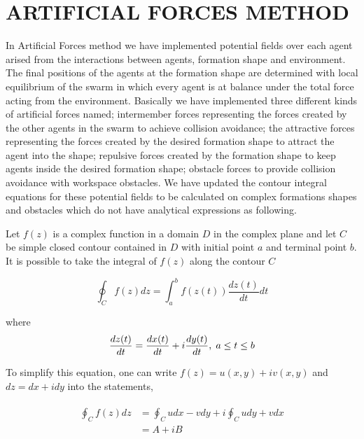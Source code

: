\documentclass[letterpaper, 10 pt, conference]{ieeeconf}  %
\begin{document}
\section{ARTIFICIAL FORCES METHOD}
In Artificial Forces method we have implemented potential fields over each agent arised from the interactions between agents, formation shape and environment. The final positions of the agents at the formation shape  are determined with local equilibrium of the swarm in which every agent is at balance under the total force acting from the environment. Basically we have implemented three different kinds of artificial forces named; intermember forces representing the forces created by the other agents in the swarm to achieve collision avoidance; the attractive forces representing the forces created by the desired formation shape to attract the agent into the shape; repulsive forces created by the formation shape to keep agents inside the desired formation shape; obstacle forces to provide collision avoidance with workspace obstacles. We have updated the contour integral equations for these potential fields \cite{17} to be calculated on complex formations shapes and obstacles which do not have analytical expressions as following.

Let $f(z)$ is a complex function in a domain $D$ in the complex plane and let $C$ be simple closed contour contained in $D$ with initial point $a$ and terminal point  $b$. It is possible to take the integral of $f(z)$ along the contour $C$ \cite{wiki_contour}
		
\begin{equation}
\oint_C f(z) dz = \int_{a}^{b} f(z(t))\frac{dz(t)}{dt} dt
\end{equation}		

where
\begin{equation}
\frac{dz(t)}{dt} = \frac{dx(t)}{dt} + i\frac{dy(t)}{dt},   \hspace{0.1cm} a\leq t\leq b
\end{equation}
		
To simplify this equation, one can write $f(z) = u(x,y) + iv(x,y)$ and $dz = dx + idy$ into the statements,

\begin{align} \label{contour_integral}
\begin{split}
\oint_C f(z)dz & = \oint_C u dx - v dy + i \oint_C u dy + v dx \\
&= A + i B
\end{split}
\end{align}
\end{document}
